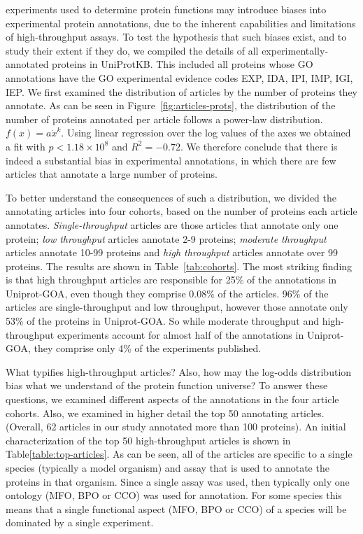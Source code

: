 \documentclass[12pt]{article}
\begin{document}
experiments used to determine protein functions may introduce biases into experimental protein
annotations, due to the inherent capabilities and limitations of high-throughput assays.  To test
the hypothesis that such biases exist, and to study their extent if they do, we compiled the
details of all experimentally-annotated proteins in UniProtKB. This included all proteins whose GO
annotations have the GO experimental evidence codes EXP, IDA, IPI, IMP, IGI, IEP. We first examined
the distribution of articles by the number of proteins they annotate. 
As can be seen in Figure~\ref{fig:articles-prots}, the distribution of the number of proteins
annotated per article follows a power-law distribution. $f(x)=a\dot x^k$.  Using linear regression
over the log values of the axes we obtained a fit with $p<1.18\times 10^8$ and $R^2=-0.72$.  We
therefore conclude that there is indeed a substantial bias in experimental annotations, in which
there are few articles that annotate a large number of proteins.

To better understand the consequences of such a distribution, we divided the annotating articles
into four cohorts, based on the number of proteins each article annotates.
\textit{Single-throughput} articles are those articles that annotate only one protein; \textit{low
throughput} articles annotate 2-9 proteins; \textit{moderate throughput} articles annotate 10-99
proteins and \textit{high throughput} articles annotate over 99 proteins. The results are shown in
Table~\ref{tab:cohorts}. The most striking finding is that high throughput articles are responsible
for 25\% of the annotations in Uniprot-GOA, even though they comprise 0.08\% of the articles. 96\%
of the articles are single-throughput and low throughput, however those annotate only 53\% of the
proteins in Uniprot-GOA. So while moderate throughput and high-throughput experiments account for
almost half of the annotations in Uniprot-GOA, they comprise only 4\% of the experiments
published.

What typifies high-throughput articles? Also, how may the log-odds distribution bias what we
understand of the protein function universe? To answer these questions, we examined
different aspects of the annotations in the four article cohorts. Also, we examined in higher
detail the top 50 annotating articles. (Overall, 62 articles in our study annotated more than
100 proteins). 
An initial characterization of the top 50 high-throughput articles is shown in
Table\ref{table:top-articles}. As can be seen, all of the articles are specific to a
single species (typically a model organism) and assay that is used to annotate the proteins
in that organism.  Since a single assay was used, then typically only one ontology (MFO, BPO
or CCO) was used for annotation. For some species this means that a single functional aspect
(MFO, BPO or CCO) of a species will be dominated by a single experiment.
\end{document}
